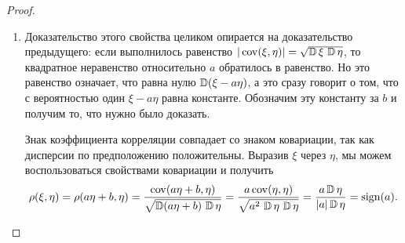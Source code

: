 \begin{proof}
\begin{enumerate}
        По доказанному выше <<стирание>> индексов не изменит коэффициентов.

    \item 
        Доказательство этого свойства целиком опирается на доказательство предыдущего: если выполнилось равенство $|\operatorname{cov}(\xi, \eta)|=\sqrt{\operatorname{\mathbb{D}} \xi \, \operatorname{\mathbb{D}} \eta}$, 
        то квадратное неравенство относительно $a$ обратилось в равенство.
        Но это равенство означает, что равна нулю $\operatorname{\mathbb{D}}(\xi - a \eta)$, а это сразу говорит о том, что с вероятностью один $\xi - a\eta$ равна константе.
        Обозначим эту константу за $b$ и получим то, что нужно было доказать.
        
        Знак коэффициента корреляции совпадает со знаком ковариации, так как дисперсии по предположению положительны. Выразив $\xi$ через $\eta$, мы можем воспользоваться свойствами ковариации и получить
        \begin{equation*}
            \rho(\xi, \eta) = \rho(a\eta + b, \eta)=
            \frac{\operatorname{cov}(a\eta + b, \eta)}
            {\sqrt{\operatorname{\mathbb{D}}(a\eta + b) \, \operatorname{\mathbb{D}}\eta}} =
            \frac{a\operatorname{cov}(\eta, \eta)}
            {\sqrt{a^2\, \operatorname{\mathbb{D}}\eta \, \operatorname{\mathbb{D}}\eta}} = 
            \frac{a\operatorname{\mathbb{D}}\eta}
            {|a|\operatorname{\mathbb{D}}\eta} =
            \operatorname{sign}(a). \qedhere
        \end{equation*}
\end{enumerate}
\end{proof}
